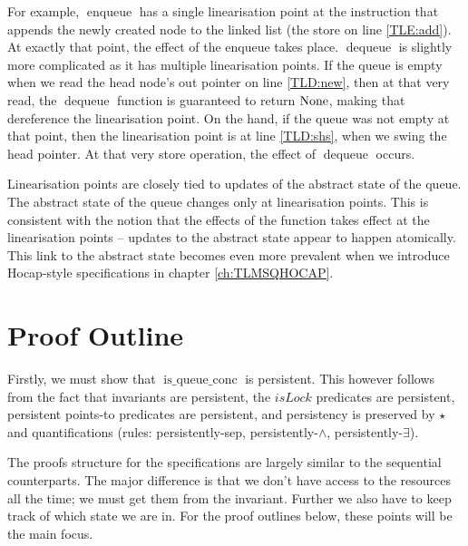 \documentclass[a4paper, 11pt]{report}
\newcommand{\enqueue}{\operatorname{enqueue}}
\newcommand{\dequeue}{\operatorname{dequeue}}
\newcommand{\isqueueconc}{\operatorname{is\_queue\_conc}}
\begin{document}
For example, $\enqueue$ has a single linearisation point at the instruction that appends the newly created node to the linked list (the store on line \ref{TLE:add}). At exactly that point, the effect of the enqueue takes place. $\dequeue$ is slightly more complicated as it has multiple linearisation points. If the queue is empty when we read the head node's out pointer on line \ref{TLD:new}, then at that very read, the $\dequeue$ function is guaranteed to return $\operatorname{None}$, making that dereference the linearisation point. On the hand, if the queue was not empty at that point, then the linearisation point is at line \ref{TLD:shs}, when we swing the head pointer. At that very store operation, the effect of $\dequeue$ occurs.

Linearisation points are closely tied to updates of the abstract state of the queue. The abstract state of the queue changes only at linearisation points. This is consistent with the notion that the effects of the function takes effect at the linearisation points -- updates to the abstract state appear to happen atomically. This link to the abstract state becomes even more prevalent when we introduce Hocap-style specifications in chapter \ref{ch:TLMSQHOCAP}.

\section{Proof Outline}
\label{TLMSQCONC:section:proof-outline}
Firstly, we must show that $\isqueueconc$ is persistent. This however follows from the fact that invariants are persistent, the $isLock$ predicates are persistent, persistent points-to predicates are persistent, and persistency is preserved by $\star$ and quantifications (rules: persistently-sep, persistently-$\land$, persistently-$\exists$).

The proofs structure for the specifications are largely similar to the sequential counterparts. The major difference is that we don't have access to the resources all the time; we must get them from the invariant. Further we also have to keep track of which state we are in. For the proof outlines below, these points will be the main focus.
\end{document}
